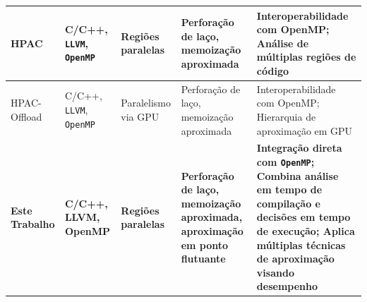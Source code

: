 \begin{table}[htb]
\begin{tabular}{|p{2.5cm}|p{2.7cm}|p{2cm}|p{2.7cm}|p{3.8cm}|}
        \hline
        HPAC~\cite{parasyris2021}                 & C/C++, \texttt{LLVM}, \texttt{OpenMP}                 & Regiões paralelas              & Perforação de laço, memoização aproximada                                                               & Interoperabilidade com OpenMP; Análise de múltiplas regiões de código                                                                                                      \\
        \hline
        HPAC-Offload~\cite{fink2023}              & C/C++, \texttt{LLVM}, \texttt{OpenMP}                 & Paralelismo via GPU            & Perforação de laço, memoização aproximada                                                               & Interoperabilidade com OpenMP; Hierarquia de aproximação em GPU                                                                                                            \\
        \hline
        \textbf{Este Trabalho}                    & \textbf{C/C++, LLVM, OpenMP}        & \textbf{Regiões paralelas}     & \textbf{Perforação de laço, memoização aproximada, aproximação em ponto flutuante} & \textbf{Integração direta com \texttt{OpenMP}; Combina análise em tempo de compilação e decisões em tempo de execução; Aplica múltiplas técnicas de aproximação visando desempenho} \\
        \hline
    \end{tabular}
    \fonte{}
    \label{tab:trabComp}
\end{table}
